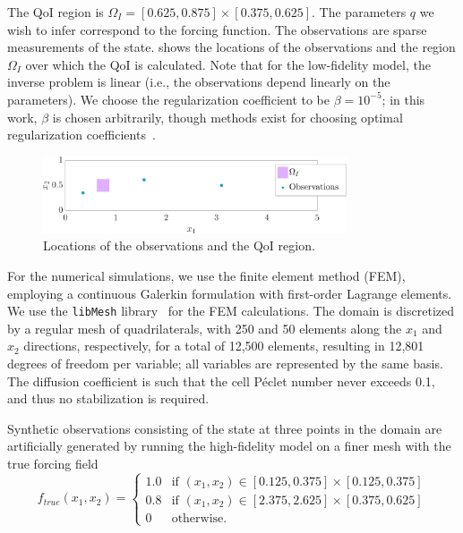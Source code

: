 \documentclass[review,sort&compress]{elsarticle}
\theoremstyle{plain} %
\theoremstyle{definition} %
\begin{document}
The QoI region is $\Omega_I=[0.625,0.875]\times[0.375,0.625]$. The parameters $q$ we wish to infer correspond to the forcing function. The observations are sparse measurements of the state.
 shows the locations of the observations and the region $\Omega_I$ over which the QoI is calculated. Note that for the low-fidelity model, the inverse problem is linear (i.e., the observations depend linearly on the parameters). We choose the regularization coefficient to be $\beta=10^{-5}$; in this work, $\beta$ is chosen arbitrarily, though methods exist for choosing optimal regularization coefficients~\cite{BelgeKilmerMiller02,Calvetal00}.
%
\begin{figure}[htbp]
\centering
\includegraphics[width=0.8\textwidth]{baseSeries/setup_3_3.pdf}
\caption{Locations of the observations and the QoI region.}
\label{fig:baseSetup}
\end{figure}
%

For the numerical simulations, we use the finite element method (FEM), employing a continuous Galerkin formulation with first-order Lagrange elements. We use the \texttt{libMesh} library~\cite{libMeshPaper} for the FEM calculations. The domain is discretized by a regular mesh of quadrilaterals, with 250 and 50 elements along the $x_1$ and $x_2$ directions, respectively, for a total of 12,500 elements, resulting in 12,801 degrees of freedom per variable; all variables are represented by the same basis. The diffusion coefficient is such that the cell P\'{e}clet number never exceeds 0.1, and thus no stabilization is required.

Synthetic observations consisting of the state at three points in the domain are artificially generated by running the high-fidelity model on a finer mesh with the true forcing field
%
\begin{equation}
f_{true}(x_1,x_2)=
\begin{cases}
1.0 & \textrm{if }(x_1,x_2)\in[0.125,0.375]\times[0.125,0.375] \\
0.8 & \textrm{if }(x_1,x_2)\in[2.375,2.625]\times[0.375,0.625] \\
0 & \textrm{otherwise}.
\end{cases}
\end{equation}
%
%
\end{document}

